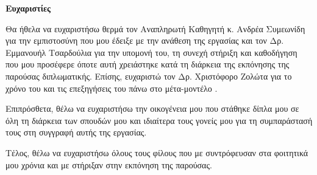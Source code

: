 \begin{center}
    \textbf{\Large{Ευχαριστίες}}
\end{center}

Θα ήθελα να ευχαριστήσω θερμά τον Αναπληρωτή Kαθηγητή κ. Ανδρέα Συμεωνίδη για την εμπιστοσύνη που μου έδειξε με την ανάθεση της εργασίας
και τον Δρ. Εμμανουήλ Τσαρδούλια για την υπομονή του, τη συνεχή στήριξη και καθοδήγηση που μου προσέφερε όποτε αυτή χρειάστηκε κατά τη διάρκεια της εκπόνησης της παρούσας διπλωματικής.
Επίσης, ευχαριστώ τον Δρ. Χριστόφορο Ζολώτα για το χρόνο του και τις επεξηγήσεις του πάνω στο μέτα-μοντέλο \metamodel{}.

Επιπρόσθετα, θέλω να ευχαριστήσω την οικογένεια μου που στάθηκε δίπλα μου σε όλη τη διάρκεια των σπουδών μου και ιδιαίτερα τους γονείς μου για τη συμπαράστασή τους στη συγγραφή αυτής της εργασίας.

Τέλος, θέλω να ευχαριστήσω όλους τους φίλους που με συντρόφευσαν στα φοιτητικά μου χρόνια και με στήριξαν στην εκπόνηση της παρούσας.

